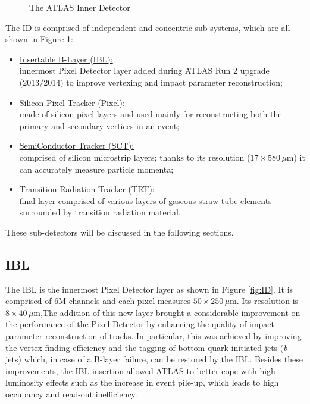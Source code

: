 			\begin{figure}[!htb]
				\hfill
				\caption{The ATLAS Inner Detector}
				\label{fig:AID}
			\end{figure}


			The ID is comprised of independent and concentric sub-systems, which are all shown in Figure \ref{fig:AID}: %

			\begin{itemize}
				\item \underline{Insertable B-Layer (IBL):} \\innermost Pixel Detector layer added during ATLAS Run 2 upgrade (2013/2014) to improve vertexing and impact parameter reconstruction;
				\item \underline{Silicon Pixel Tracker (Pixel):} \\made of silicon pixel layers and used mainly for reconstructing both the primary and secondary vertices in an event;
				\item \underline{SemiConductor Tracker (SCT):} \\comprised of silicon microstrip layers; thanks to its resolution ($17 \times 580\, \mu$m) it can accurately measure particle momenta;
				\item \underline{Transition Radiation Tracker (TRT):} \\final layer comprised of various layers of gaseous straw tube elements surrounded by transition radiation material.
			\end{itemize}

			These sub-detectors will be discussed in the following sections.  

			\subsection*{IBL} 
				
				The IBL \cite{IBLTDR} is the innermost Pixel Detector layer as shown in Figure \ref{fig:ID}. It is comprised of 6M channels and each pixel measures $50 \times 250\,\mu$m. Its resolution is $8 \times 40\, \mu$m,The addition of this new layer brought a considerable improvement on the performance of the Pixel Detector by enhancing the quality of impact parameter reconstruction of tracks. In particular, this was achieved by improving the vertex finding efficiency and the tagging of bottom-quark-initiated jets (\emph{b}-jets) which, in case of a B-layer failure, can be restored by the IBL. Besides these improvements, the IBL insertion allowed ATLAS to better cope with high luminosity effects such as the increase in event pile-up, which leads to high occupancy and read-out inefficiency. 


